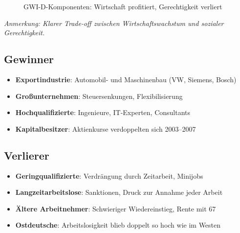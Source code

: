 \begin{figure}[ht]
    \centering
    \caption{GWI-D-Komponenten: Wirtschaft profitiert, Gerechtigkeit verliert}
    \label{fig:agenda_bilanz}
\end{figure}

\begin{flushleft}
\footnotesize{\textit{Anmerkung: Klarer Trade-off zwischen Wirtschaftswachstum und sozialer Gerechtigkeit.}}
\end{flushleft}

\subsection{Gewinner}

\begin{itemize}
    \item \textbf{Exportindustrie}: Automobil- und Maschinenbau (VW, Siemens, Bosch)
    \item \textbf{Großunternehmen}: Steuersenkungen, Flexibilisierung
    \item \textbf{Hochqualifizierte}: Ingenieure, IT-Experten, Consultants
    \item \textbf{Kapitalbesitzer}: Aktienkurse verdoppelten sich 2003–2007
\end{itemize}

\subsection{Verlierer}

\begin{itemize}
    \item \textbf{Geringqualifizierte}: Verdrängung durch Zeitarbeit, Minijobs
    \item \textbf{Langzeitarbeitslose}: Sanktionen, Druck zur Annahme jeder Arbeit
    \item \textbf{Ältere Arbeitnehmer}: Schwieriger Wiedereinstieg, Rente mit 67
    \item \textbf{Ostdeutsche}: Arbeitslosigkeit blieb doppelt so hoch wie im Westen
\end{itemize}

